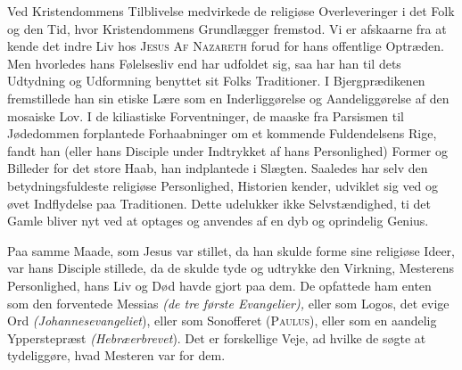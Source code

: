 \documentclass[12pt,a4paper,openany]{book}
\begin{document}
Ved Kristendommens Tilblivelse medvirkede de religiøse Overleveringer i
det Folk og den Tid, hvor Kristendommens Grundlægger fremstod. Vi er
afskaarne fra at kende det indre Liv hos \textsc{Jesus Af Nazareth}
forud for hans offentlige Optræden. Men hvorledes hans Følelsesliv end
har udfoldet sig, saa har han til dets Udtydning og Udformning benyttet
sit Folks Traditioner. I Bjergprædikenen fremstillede han sin etiske
Lære som en Inderliggørelse og Aandeliggørelse af den mosaiske Lov. I de
kiliastiske Forventninger, de maaske fra Parsismen til Jødedommen
forplantede Forhaabninger om et kommende Fuldendelsens Rige, fandt han
(eller hans Disciple under Indtrykket af hans Personlighed) Former og
Billeder for det store Haab, han indplantede i Slægten. Saaledes har
selv den betydningsfuldeste religiøse Personlighed, Historien kender,
udviklet sig ved og øvet Indflydelse paa Traditionen. Dette udelukker
ikke Selvstændighed, ti det Gamle bliver nyt ved at optages og anvendes
af en dyb og oprindelig Genius.

Paa samme Maade, som Jesus var stillet, da han skulde forme sine
religiøse Ideer, var hans Disciple stillede, da de skulde tyde og
udtrykke den Virkning, Mesterens Personlighed, hans Liv og Død havde
gjort paa dem. De opfattede ham enten som den forventede Messias
\textit{(de tre første Evangelier),} eller som Logos, det evige Ord
\textit{(Johannesevangeliet}), eller som Sonofferet \textsc{(Paulus)},
eller som en aandelig Ypperstepræst \textit{(Hebræerbrevet}). Det er
forskellige Veje, ad hvilke de søgte at tydeliggøre, hvad Mesteren var
for dem.
\end{document}
